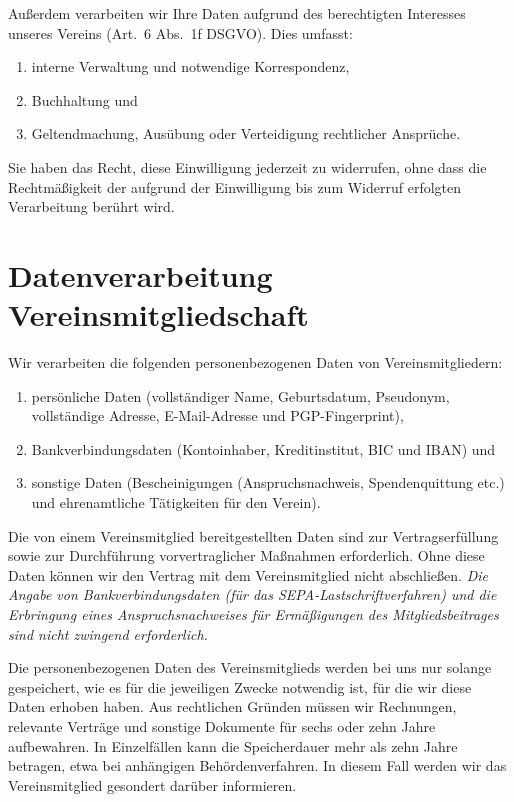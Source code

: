 \documentclass[a4paper, 10pt, headings=normal]{scrartcl}
\begin{document}
\begin{multicols*}{2}
Außerdem verarbeiten wir Ihre Daten aufgrund des berechtigten Interesses unseres Vereins (Art.~6 Abs.~1f DSGVO). Dies umfasst:

\begin{enumerate}[label={\arabic*.}]
	\item
		interne Verwaltung und notwendige Korrespondenz,
	\item
		Buchhaltung und
	\item
		Geltendmachung, Ausübung oder Verteidigung rechtlicher Ansprüche.
\end{enumerate}

Sie haben das Recht, diese Einwilligung jederzeit zu widerrufen, ohne dass die Rechtmäßigkeit der aufgrund der Einwilligung bis zum Widerruf erfolgten Verarbeitung berührt wird.

\section{Datenverarbeitung Vereinsmitgliedschaft}

Wir verarbeiten die folgenden personenbezogenen Daten von Vereinsmitgliedern:

\begin{enumerate}[label={\arabic*.}]
	\item
		persönliche Daten (vollständiger Name, Geburtsdatum, Pseudonym, vollständige Adresse, E-Mail-Adresse und PGP-Fingerprint),
	\item
		Bankverbindungsdaten (Kontoinhaber, Kreditinstitut, BIC und IBAN) und
	\item
		sonstige Daten (Bescheinigungen (Anspruchsnachweis, Spendenquittung etc.) und ehrenamtliche Tätigkeiten für den Verein).
\end{enumerate}

Die von einem Vereinsmitglied bereitgestellten Daten sind zur Vertragserfüllung sowie zur Durchführung vorvertraglicher Maßnahmen erforderlich.
Ohne diese Daten können wir den Vertrag mit dem Vereinsmitglied nicht abschließen.
\emph{Die Angabe von Bankverbindungsdaten (für das SEPA-Lastschriftverfahren) und die Erbringung eines Anspruchsnachweises für Ermäßigungen des Mitgliedsbeitrages sind nicht zwingend erforderlich.}

Die personenbezogenen Daten des Vereinsmitglieds werden bei uns nur solange gespeichert, wie es für die jeweiligen Zwecke notwendig ist, für die wir diese Daten erhoben haben.
Aus rechtlichen Gründen müssen wir Rechnungen, relevante Verträge und sonstige Dokumente für sechs oder zehn Jahre aufbewahren.
In Einzelfällen kann die Speicherdauer mehr als zehn Jahre betragen, etwa bei anhängigen Behördenverfahren.
In diesem Fall werden wir das Vereinsmitglied gesondert darüber informieren.


\end{multicols*}
\end{document}
